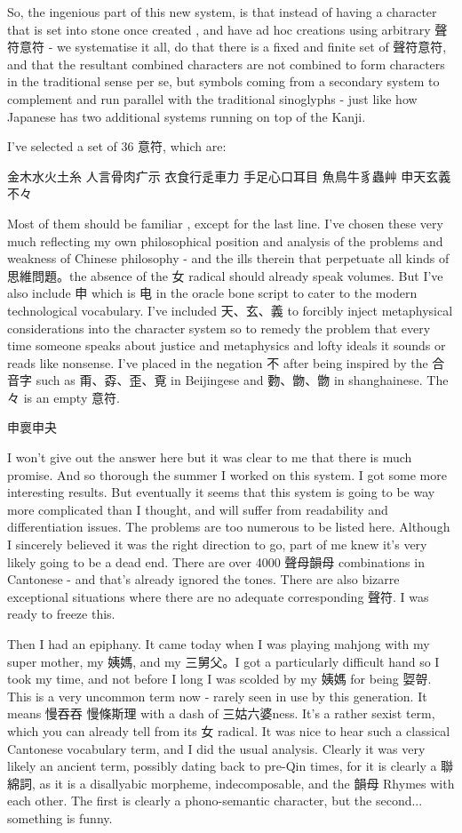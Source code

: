\documentclass[a5paper, 10pt, openany]{book} %
\begin{document}
So, the ingenious part of this new system, is that instead of having a character that is set into stone once created , and have ad hoc creations using arbitrary 聲符意符 - we systematise it all, do that there is a fixed and finite set of 聲符意符, and that the resultant combined characters are not combined to form characters in the traditional sense per se, but symbols coming from a secondary system to complement and run parallel with the traditional sinoglyphs - just like how Japanese has two additional systems running on top of the Kanji.

I've selected a set of 36 意符, which are:

金木水火土糸
人言骨肉疒示
衣食行辵車力
手足心口耳目
魚鳥牛豸蟲艸
申天玄義不々

Most of them should be familiar , except for the last line. I've chosen these very much reflecting my own philosophical position and analysis of the problems and weakness of Chinese philosophy - and the ills therein that perpetuate all kinds of 思維問題。the absence of the 女 radical should already speak volumes. But I've also include 申 which is 电 in the oracle bone script to cater to the modern technological vocabulary. I've included 天、玄、義 to forcibly inject metaphysical considerations into the character system so to remedy the problem that every time someone speaks about justice and metaphysics and lofty ideals it sounds or reads like nonsense. I've placed in the negation 不 after being inspired by the 合音字 such as 甭、孬、歪、覔 in Beijingese and 覅、朆、朆 in shanghainese. The 々 is an empty 意符.

申褱申夬


I won't give out the  answer here but it was clear to me that there is much promise. And so thorough the summer I worked on this system. I got some more interesting results. But eventually it seems that this system is going to be way more complicated than I thought, and will suffer from readability and differentiation issues. The problems are too numerous to be listed here. Although I sincerely believed it was the right direction to go, part of me knew it's very likely going to be a dead end. There are over 4000 聲母韻母 combinations in Cantonese - and that's already ignored the tones. There are also bizarre exceptional situations where there are no adequate corresponding 聲符. I was ready to freeze this.

Then I had an epiphany. It came today when I was playing mahjong with my super mother, my 姨媽, and my 三舅父。I got a particularly difficult hand so I took my time, and not before I long I was scolded by my 姨媽 for being 娿哿. This is a very uncommon term now - rarely seen in use by this generation. It means 慢吞吞 慢條斯理 with a dash of 三姑六婆ness. It's a rather sexist term, which you can already tell from its 女 radical. It was nice to hear such a classical Cantonese vocabulary term, and I did the usual analysis. Clearly it was very likely an ancient term, possibly dating back to pre-Qin times, for it is clearly a 聯綿詞, as it is a disallyabic morpheme, indecomposable, and the 韻母 Rhymes with each other. The first is clearly a phono-semantic character, but the second... something is funny.
\end{document}
